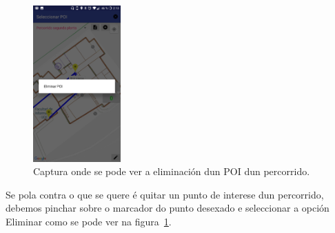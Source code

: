 \begin{figure}[h]
	\begin{center}
		\includegraphics[width=0.3\textwidth]{figures/android/mapaEliminarPoiPercorrido}
		\caption{Captura onde se pode ver a eliminación dun POI dun percorrido.}
		\label{fig:mapaEliminarPoiPercorrido}
	\end{center}
\end{figure}

Se pola contra o que se quere é quitar un punto de interese dun percorrido, debemos pinchar sobre o marcador do punto desexado e seleccionar a opción Eliminar como se pode ver na figura~\ref{fig:mapaEliminarPoiPercorrido}.

